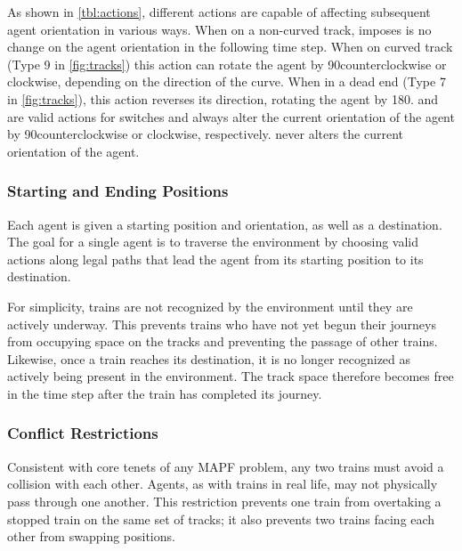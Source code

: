 \documentclass[11pt]{article}
\begin{document}
\endgroup


As shown in \autoref{tbl:actions}, different actions are capable of affecting subsequent agent orientation in various ways.  When on a non-curved track,  imposes is no change on the agent orientation in the following time step.  When on curved track (Type 9 in \autoref{fig:tracks}) this action can rotate the agent by 90\degree counterclockwise or clockwise, depending on the direction of the curve.   When in a dead end (Type 7 in \autoref{fig:tracks}), this action reverses its direction, rotating the agent by 180\degree .   and  are valid actions for switches and always alter the current orientation of the agent by 90\degree counterclockwise or clockwise, respectively.   never alters the current orientation of the agent.

\subsubsection{Starting and Ending Positions}
\label{sec:Positions}
Each agent is given a starting position and orientation, as well as a destination.  The goal for a single agent is to traverse the environment by choosing valid actions along legal paths that lead the agent from its starting position to its destination.  

For simplicity, trains are not recognized by the environment until they are actively underway.  This prevents trains who have not yet begun their journeys from occupying space on the tracks and preventing the passage of other trains.  Likewise, once a train reaches its destination, it is no longer recognized as actively being present in the environment.  The track space therefore becomes free in the time step after the train has completed its journey.

\subsubsection{Conflict Restrictions}
\label{sec:Conflicts}
Consistent with core tenets of any MAPF problem, any two trains must avoid a collision with each other.  Agents, as with trains in real life, may not physically pass through one another.  This restriction prevents one train from overtaking a stopped train on the same set of tracks; it also prevents two trains facing each other from swapping positions.



\end{document}
